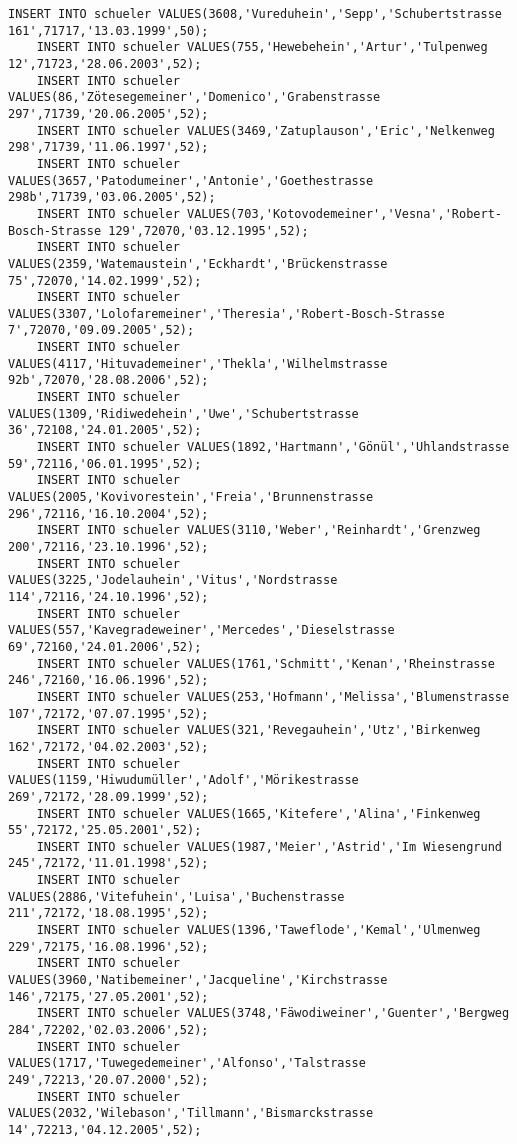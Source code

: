 \begin{lstlisting}[breaklines=True, numbers=none, basicstyle=\tiny, keepspaces=false]
	INSERT INTO schueler VALUES(3608,'Vureduhein','Sepp','Schubertstrasse 161',71717,'13.03.1999',50);
	INSERT INTO schueler VALUES(755,'Hewebehein','Artur','Tulpenweg 12',71723,'28.06.2003',52);
	INSERT INTO schueler VALUES(86,'Zötesegemeiner','Domenico','Grabenstrasse 297',71739,'20.06.2005',52);
	INSERT INTO schueler VALUES(3469,'Zatuplauson','Eric','Nelkenweg 298',71739,'11.06.1997',52);
	INSERT INTO schueler VALUES(3657,'Patodumeiner','Antonie','Goethestrasse 298b',71739,'03.06.2005',52);
	INSERT INTO schueler VALUES(703,'Kotovodemeiner','Vesna','Robert-Bosch-Strasse 129',72070,'03.12.1995',52);
	INSERT INTO schueler VALUES(2359,'Watemaustein','Eckhardt','Brückenstrasse 75',72070,'14.02.1999',52);
	INSERT INTO schueler VALUES(3307,'Lolofaremeiner','Theresia','Robert-Bosch-Strasse 7',72070,'09.09.2005',52);
	INSERT INTO schueler VALUES(4117,'Hituvademeiner','Thekla','Wilhelmstrasse 92b',72070,'28.08.2006',52);
	INSERT INTO schueler VALUES(1309,'Ridiwedehein','Uwe','Schubertstrasse 36',72108,'24.01.2005',52);
	INSERT INTO schueler VALUES(1892,'Hartmann','Gönül','Uhlandstrasse 59',72116,'06.01.1995',52);
	INSERT INTO schueler VALUES(2005,'Kovivorestein','Freia','Brunnenstrasse 296',72116,'16.10.2004',52);
	INSERT INTO schueler VALUES(3110,'Weber','Reinhardt','Grenzweg 200',72116,'23.10.1996',52);
	INSERT INTO schueler VALUES(3225,'Jodelauhein','Vitus','Nordstrasse 114',72116,'24.10.1996',52);
	INSERT INTO schueler VALUES(557,'Kavegradeweiner','Mercedes','Dieselstrasse 69',72160,'24.01.2006',52);
	INSERT INTO schueler VALUES(1761,'Schmitt','Kenan','Rheinstrasse 246',72160,'16.06.1996',52);
	INSERT INTO schueler VALUES(253,'Hofmann','Melissa','Blumenstrasse 107',72172,'07.07.1995',52);
	INSERT INTO schueler VALUES(321,'Revegauhein','Utz','Birkenweg 162',72172,'04.02.2003',52);
	INSERT INTO schueler VALUES(1159,'Hiwudumüller','Adolf','Mörikestrasse 269',72172,'28.09.1999',52);
	INSERT INTO schueler VALUES(1665,'Kitefere','Alina','Finkenweg 55',72172,'25.05.2001',52);
	INSERT INTO schueler VALUES(1987,'Meier','Astrid','Im Wiesengrund 245',72172,'11.01.1998',52);
	INSERT INTO schueler VALUES(2886,'Vitefuhein','Luisa','Buchenstrasse 211',72172,'18.08.1995',52);
	INSERT INTO schueler VALUES(1396,'Taweflode','Kemal','Ulmenweg 229',72175,'16.08.1996',52);
	INSERT INTO schueler VALUES(3960,'Natibemeiner','Jacqueline','Kirchstrasse 146',72175,'27.05.2001',52);
	INSERT INTO schueler VALUES(3748,'Fäwodiweiner','Guenter','Bergweg 284',72202,'02.03.2006',52);
	INSERT INTO schueler VALUES(1717,'Tuwegedemeiner','Alfonso','Talstrasse 249',72213,'20.07.2000',52);
	INSERT INTO schueler VALUES(2032,'Wilebason','Tillmann','Bismarckstrasse 14',72213,'04.12.2005',52);

\end{lstlisting}
